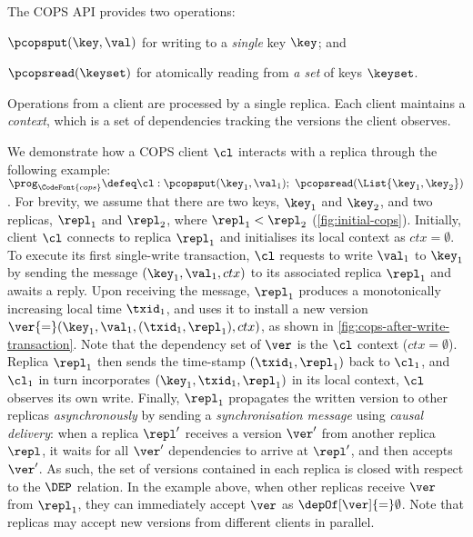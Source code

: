 The COPS API provides two operations: 
\begin{enumerate*}
	\item \( \pcopsput(\key,\val) \) for writing to a \emph{single}
key $\key$; and 
	\item \( \pcopsread(\keyset) \) for atomically reading from \emph{a set} of keys  $\keyset$.  
\end{enumerate*}
Operations from a client are  processed by a single replica. 
Each client maintains a \emph{context}, which is a set of dependencies
tracking the versions the client observes.  

We demonstrate how a COPS client \( \cl \) interacts with a replica through the following example:
\(
    \prog_\CodeFont{cops} \defeq \cl: \pcopsput(\key_1,\val_1) ; \ 
    \pcopsread(\List{\key_1,\key_2})
\).
For brevity, we assume that there are two keys, $\key_1$ and $\key_2$, 
and two replicas, $\repl_1$ and $\repl_2$, where $\repl_1 < \repl_2$ (\cref{fig:initial-cops}).
Initially, client \( \cl \) connects to replica \( \repl_1 \) and initialises its local context as $ctx {=} \emptyset$.
To execute its first single-write transaction, $\cl$ requests to write $\val_1$ to $\key_1$
by sending the message $(\key_1, \val_1, ctx)$ to its associated replica $\repl_1$
and awaits a reply.
Upon receiving the message, $\repl_1$ produces a monotonically increasing local time $\txid_1$, 
and uses it to install  a new version $\ver {=} (\key_1,\val_1, (\txid_1,\repl_1), ctx)$, as shown in \cref{fig:cops-after-write-transaction}.
Note that the dependency set of $\ver$ is the $\cl$ context ($ctx {=} \emptyset$).
Replica $\repl_1$ then sends the time-stamp $(\txid_1,\repl_1)$ back to $\cl_1$, and $\cl_1$ in turn  incorporates $(\key_1, \txid_1,\repl_1)$ in its local context,
\ie $\cl$ observes its own write. 
Finally, $\repl_1$ propagates the written version to other replicas \emph{asynchronously} by sending a \emph{synchronisation message} 
using \emph{causal delivery}:
when a replica $\repl'$ receives a version $\ver'$ from another replica $\repl$, 
it waits for all $\ver'$ dependencies to arrive at $\repl'$, and then accepts $\ver'$.
As such, the set of versions contained in each replica is closed with respect to the \( \DEP \) relation.
In the example above, when other replicas receive $\ver$ from $\repl_1$, they can immediately accept $\ver$ as \( \depOf[\ver]{=}\emptyset\). 
Note that replicas may accept new versions from different clients in parallel.

